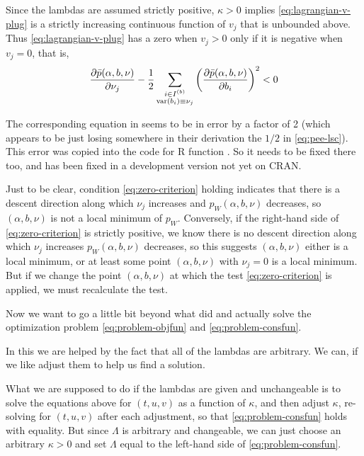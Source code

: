 Since the lambdas are assumed strictly positive, $\kappa > 0$ implies
\eqref{eq:lagrangian-v-plug} is a strictly increasing continuous function
of $v_j$ that is unbounded above.
Thus \eqref{eq:lagrangian-v-plug} has
a zero when $v_j > 0$ only if it is negative when $v_j = 0$, that is,
\begin{equation} \label{eq:zero-criterion}
   \frac{\partial \bar{p}(\alpha, b, \nu)}{\partial \nu_j}
   - \frac{1}{2} \sum_{\substack{i \in I^{(b)} \\ \operatorname{var}(b_i) \equiv \nu_j}}
   \left( \frac{\partial \bar{p}(\alpha, b, \nu)}{\partial b_i} \right)^2
   < 0
\end{equation}

The corresponding equation in \citet[their (20)]{reaster} seems to be in error
by a factor of 2 (which appears to be just losing somewhere in their
derivation the $1/2$ in
\eqref{eq:pee-lsc}).  This error was copied into the code for R function
.  So it needs to be fixed there too,
and has been fixed in a development version not yet on CRAN.

Just to be clear, condition \eqref{eq:zero-criterion} holding indicates
that there is a descent direction along which $\nu_j$ increases and
$p_W(\alpha, b, \nu)$ decreases, so $(\alpha, b, \nu)$ is
not a local minimum of $p_W$.
Conversely, if the right-hand side of \eqref{eq:zero-criterion} is strictly
positive, we know there is no descent direction along which $\nu_j$ increases
$p_W(\alpha, b, \nu)$ decreases,
so this suggests $(\alpha, b, \nu)$ either is a local minimum,
or at least some point $(\alpha, b, \nu)$ with $\nu_j = 0$ is a local
minimum.  But if we change the point $(\alpha, b, \nu)$ at which the
test \eqref{eq:zero-criterion} is applied, we must recalculate the test.

Now we want to go a little bit beyond what \citet{reaster-tr,reaster} did
and actually solve the optimization problem
\eqref{eq:problem-objfun} and \eqref{eq:problem-consfun}.

In this we are helped by the fact that all of the lambdas are arbitrary.
We can, if we like adjust them to help us find a solution.

What we are supposed to do if the lambdas are given and unchangeable is
to solve the equations above for $(t, u, v)$ as a function of $\kappa$,
and then adjust $\kappa$, re-solving for $(t, u, v)$ after each adjustment,
so that \eqref{eq:problem-consfun} holds with equality.
But since $\Lambda$ is arbitrary and changeable, we can just choose an
arbitrary $\kappa > 0$ and set $\Lambda$ equal to the left-hand side of
\eqref{eq:problem-consfun}.


